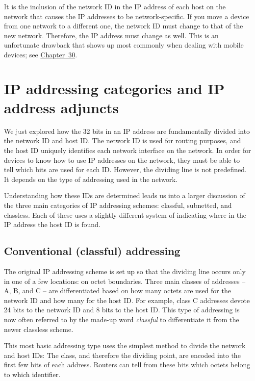 It is the inclusion of the network ID in the IP address of each host on
the network that causes the IP addresses to be network-specific. If you
move a device from one network to a different one, the network ID must
change to that of the new network. Therefore, the IP address must change
as well. This is an unfortunate drawback that shows up most commonly
when dealing with mobile devices; see
\protect\hyperlink{ch30.html}{Chapter~30}.


\section{IP addressing categories and IP address adjuncts}

We just explored how the 32 bits in an IP address are fundamentally divided into
the network ID and host ID. The network ID is used for routing purposes,
and the host ID uniquely identifies each network interface on the
network. In order for devices to know how to use IP addresses on the
network, they must be able to tell which bits are used for each ID.
However, the dividing line is not predefined. It depends on the type of
addressing used in the network.

Understanding how these IDs are determined leads us into a larger
discussion of the three main categories of IP addressing schemes:
classful, subnetted, and classless. Each of these uses a slightly
different system of indicating where in the IP address the host ID is
found.



\subsection{Conventional (classful) addressing}

The original IP addressing scheme is set up so that the dividing line
occurs only in one of a few locations: on octet boundaries. Three main
classes of addresses -- A, B, and C -- are differentiated based on how
many octets are used for the network ID and how many for the host ID.
For example, class C addresses devote 24 bits to the network ID and 8
bits to the host ID. This type of addressing is now often referred to by
the made-up word \emph{classful} to differentiate it from the newer
classless scheme.

This most basic addressing type uses the simplest method to divide the
network and host IDs: The class, and therefore the dividing point, are
encoded into the first few bits of each address. Routers can tell from
these bits which octets belong to which identifier.




